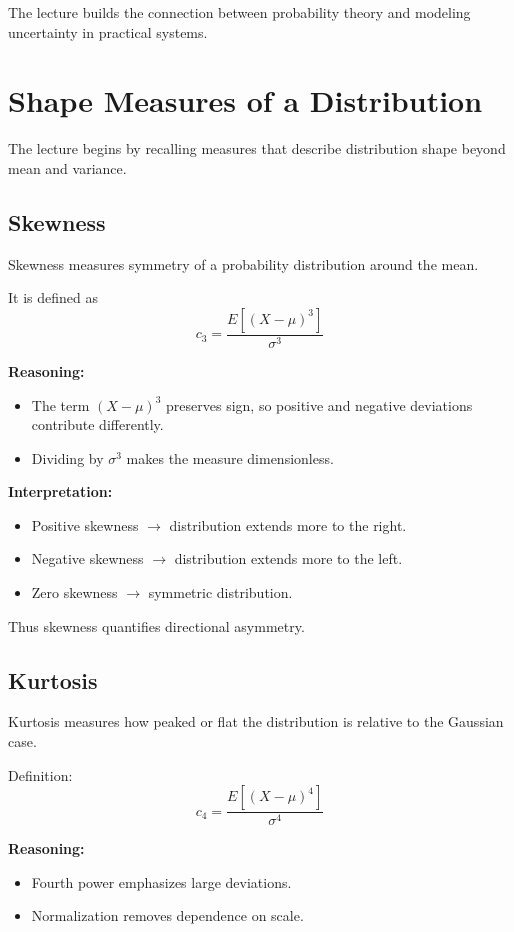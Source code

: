 \documentclass{article}
\begin{document}
The lecture builds the connection between probability theory and modeling uncertainty in practical systems.

\section{Shape Measures of a Distribution}

The lecture begins by recalling measures that describe distribution shape beyond mean and variance.

\subsection{Skewness}

Skewness measures symmetry of a probability distribution around the mean.

It is defined as
\[
c_3 = \frac{E[(X-\mu)^3]}{\sigma^3}
\]

\textbf{Reasoning:}
\begin{itemize}
    \item The term $(X-\mu)^3$ preserves sign, so positive and negative deviations contribute differently.
    \item Dividing by $\sigma^3$ makes the measure dimensionless.
\end{itemize}

\textbf{Interpretation:}
\begin{itemize}
    \item Positive skewness $\rightarrow$ distribution extends more to the right.
    \item Negative skewness $\rightarrow$ distribution extends more to the left.
    \item Zero skewness $\rightarrow$ symmetric distribution.
\end{itemize}

Thus skewness quantifies directional asymmetry.

\subsection{Kurtosis}

Kurtosis measures how peaked or flat the distribution is relative to the Gaussian case.

Definition:
\[
c_4 = \frac{E[(X-\mu)^4]}{\sigma^4}
\]

\textbf{Reasoning:}
\begin{itemize}
    \item Fourth power emphasizes large deviations.
    \item Normalization removes dependence on scale.
\end{itemize}
\end{document}
